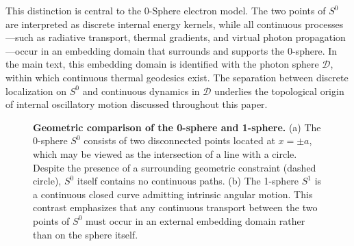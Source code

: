 \documentclass[%
 reprint,
 amsmath,amssymb,
 aps,
 prb,
]{revtex4-2}
\numberwithin{equation}{section}
\begin{document}
This distinction is central to the 0-Sphere electron model.
The two points of $S^0$ are interpreted as discrete internal energy kernels, while all continuous processes—such as radiative transport, thermal gradients, and virtual photon propagation—occur in an embedding domain that surrounds and supports the 0-sphere.
In the main text, this embedding domain is identified with the photon sphere $\mathcal{D}$, within which continuous thermal geodesics exist.
The separation between discrete localization on $S^0$ and continuous dynamics in $\mathcal{D}$ underlies the topological origin of internal oscillatory motion discussed throughout this paper.

\begin{figure}[t!]
    \centering
    \caption{\justifying \textbf{Geometric comparison of the 0-sphere and 1-sphere.}
    (a) The 0-sphere $S^0$ consists of two disconnected points located at $x=\pm a$, which may be viewed as the intersection of a line with a circle.
    Despite the presence of a surrounding geometric constraint (dashed circle), $S^0$ itself contains no continuous paths.
    (b) The 1-sphere $S^1$ is a continuous closed curve admitting intrinsic angular motion.
    This contrast emphasizes that any continuous transport between the two points of $S^0$ must occur in an external embedding domain rather than on the sphere itself.}
    \label{fig:s0_s1_comparison}
\end{figure}
\end{document}
